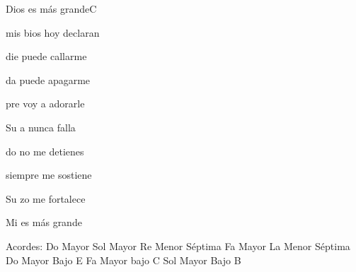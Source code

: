 \documentclass[12pt, spanish]{book}
\begin{document}
\begin{song}{Dios es más grande}{C}
\begin{SBOpGroup}
            mis bios hoy declaran 
        \end{SBOpGroup}
        \vskip 20pt
        \begin{SBOpGroup}
            die puede callarme

            da puede apagarme

            pre voy a adorarle

            Su a nunca falla

            do no me detienes

             siempre me sostiene

            Su zo me fortalece

            Mi  es más grande
        \end{SBOpGroup}

        \ifChordBk
        \begin{SBOpGroup}
            Acordes:\break
            \upchord{\C}\qquad Do Mayor \hfill
            \upchord{\G}\qquad Sol Mayor \hfill\null\break
            \upchord{\Dmseven}\qquad Re Menor S\'eptima \hfill
            \upchord{\F}\qquad Fa Mayor \hfill\null\break
            \upchord{\Amseven}\qquad La Menor S\'eptima \hfill
            \upchord{\CE}\qquad Do Mayor Bajo E  \hfill\null\break
            \upchord{\FC}Fa Mayor bajo C \hfill
            \upchord{\GB}\qquad Sol Mayor Bajo B \hfill\qquad\qquad\qquad
        \end{SBOpGroup}
        \fi
    \end{song}
\end{document}
